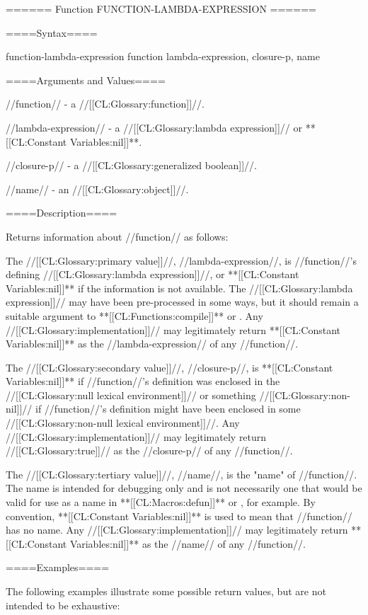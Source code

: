 ====== Function FUNCTION-LAMBDA-EXPRESSION ======

====Syntax====

\DefunWithValuesNewline function-lambda-expression {function} {lambda-expression, closure-p, name}

====Arguments and Values====

//function// - a //[[CL:Glossary:function]]//.

//lambda-expression// - a //[[CL:Glossary:lambda expression]]// or **[[CL:Constant Variables:nil]]**.

//closure-p// - a //[[CL:Glossary:generalized boolean]]//.

//name// - an //[[CL:Glossary:object]]//.

====Description====

Returns information about //function// as follows:

The //[[CL:Glossary:primary value]]//, //lambda-expression//, is //function//'s defining //[[CL:Glossary:lambda expression]]//, or **[[CL:Constant Variables:nil]]** if the information is not available. The //[[CL:Glossary:lambda expression]]// may have been pre-processed in some ways, but it should remain a suitable argument to **[[CL:Functions:compile]]** or . Any //[[CL:Glossary:implementation]]// may legitimately return **[[CL:Constant Variables:nil]]** as the //lambda-expression// of any //function//.

The //[[CL:Glossary:secondary value]]//, //closure-p//, is **[[CL:Constant Variables:nil]]** if //function//'s definition was enclosed in the //[[CL:Glossary:null lexical environment]]// or something //[[CL:Glossary:non-nil]]// if //function//'s definition might have been enclosed in some //[[CL:Glossary:non-null lexical environment]]//. Any //[[CL:Glossary:implementation]]// may legitimately return //[[CL:Glossary:true]]// as the //closure-p// of any //function//.

The //[[CL:Glossary:tertiary value]]//, //name//, is the "name" of //function//. The name is intended for debugging only and is not necessarily one that would be valid for use as a name in **[[CL:Macros:defun]]** or , for example. By convention, **[[CL:Constant Variables:nil]]** is used to mean that //function// has no name. Any //[[CL:Glossary:implementation]]// may legitimately return **[[CL:Constant Variables:nil]]** as the //name// of any //function//.


====Examples====

The following examples illustrate some possible return values, but are not intended to be exhaustive:

